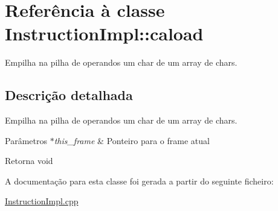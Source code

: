 \hypertarget{class_instruction_impl_1_1caload}{}\section{Referência à classe Instruction\+Impl\+:\+:caload}
\label{class_instruction_impl_1_1caload}


Empilha na pilha de operandos um char de um array de chars.  




\subsection{Descrição detalhada}
Empilha na pilha de operandos um char de um array de chars. 


\begin{DoxyParams}{Parâmetros}
{\em $\ast$this\+\_\+frame} & Ponteiro para o frame atual \\
\hline
\end{DoxyParams}
\begin{DoxyReturn}{Retorna}
void 
\end{DoxyReturn}


A documentação para esta classe foi gerada a partir do seguinte ficheiro\+:\begin{DoxyCompactItemize}
\item 
\hyperlink{_instruction_impl_8cpp}{Instruction\+Impl.\+cpp}\end{DoxyCompactItemize}
